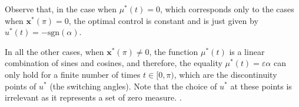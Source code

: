 \documentclass[9pt,shortpaper,twoside,web]{ieeecolor}
\begin{document}
%	

Observe that, in the case when $\mu^\ast(t) = 0$, which corresponds only to the cases when $\bm{x}^\ast(\pi) = 0$, the optimal control is constant and is just given by  $u^\ast (t) =  -\text{sgn} (\alpha)$.

In all the other cases, when $\bm{x}^\ast(\pi)\neq 0$, the function $\mu^\ast(t)$ is a linear combination of sines and cosines, and therefore, the equality $\mu^\ast (t) = \varepsilon\alpha$ can only hold for a finite number of times $t\in [0,\pi)$, which are the discontinuity points of $u^\ast$ (the switching angles). Note that the choice of $u^\ast$ at these points is irrelevant as it represents a set of zero measure. .
\end{document}
